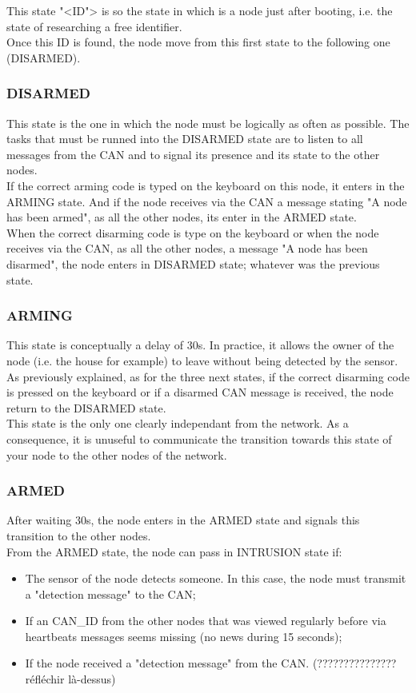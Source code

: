 \documentclass[10pt,a4paper]{article}
\theoremstyle{definition}%
\begin{document}
	This state "<ID"> is so the state in which is a node just after booting, i.e. the state of researching a free identifier.\\
	Once this ID is found, the node move from this first state to the following one (DISARMED). 
	
 \subsubsection{DISARMED}
  This state is the one in which the node must be logically as often as possible. The tasks that must be runned into the DISARMED state are to listen to all messages from the CAN and to signal its presence and its state to the other nodes.\\
	
	If the correct arming code is typed on the keyboard on this node, it enters in the ARMING state. And if the node receives via the CAN a message stating "A node has been armed", as all the other nodes, its enter in the ARMED state.\\
		
	When the correct disarming code is type on the keyboard or when the node receives via the CAN, as all the other nodes, a message "A node has been disarmed", the node enters in DISARMED state; whatever was the previous state.
 
 \subsubsection{ARMING}
This state is conceptually a delay of 30s. In practice, it allows the owner of the node (i.e. the house for example) to leave without being detected by the sensor.\\
As previously explained, as for the three next states, if the correct disarming code is pressed on the keyboard or if a disarmed CAN message is received, the node return to the DISARMED state.\\
This state is the only one clearly independant from the network. As a consequence, it is unuseful to communicate the transition towards this state of your node to the other nodes of the network.

 \subsubsection{ARMED}
After waiting 30s, the node enters in the ARMED state and signals this transition to the other nodes.\\
From the ARMED state, the node can pass in INTRUSION state if:
\begin{itemize}
 \item The sensor of the node detects someone. In this case, the node must transmit a "detection message" to the CAN;
 \item If an CAN\_ID from the other nodes that was viewed regularly before via heartbeats messages seems missing (no news during 15 seconds);
 \item If the node received a "detection message" from the CAN. (??????????????? réfléchir là-dessus)
\end{itemize}
\end{document}
